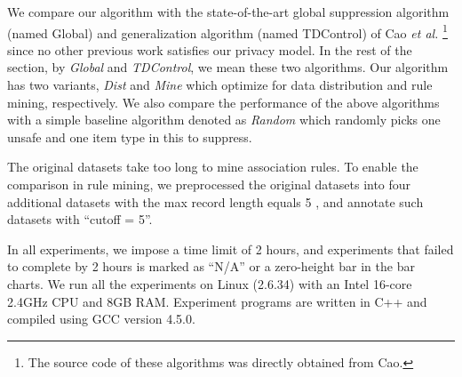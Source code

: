 We compare our algorithm with the state-of-the-art global suppression
algorithm (named Global) and generalization algorithm (named TDControl) of
Cao {\em et al.} \cite{Cao:2010:rho}\footnote{The source code of these
algorithms was directly obtained from Cao.} since no other previous work
satisfies our privacy model. In the rest of the section, by {\em Global}
and {\em TDControl}, we mean these two algorithms.
Our algorithm has two variants, {\em Dist} and {\em Mine} which optimize
for data distribution and rule mining, respectively.
We also compare the performance of the above algorithms with a simple
baseline algorithm denoted as {\em Random} which
randomly picks one unsafe \qid and one item type in this \qid to suppress.

The original datasets take too long to mine association rules.
 To enable the comparison in rule mining, we preprocessed the
original datasets into four additional datasets with the max record length equals 5
, and annotate such datasets with ``cutoff = 5''.



In all experiments, we impose a time limit of
2 hours, and experiments that failed to complete by 2 hours is marked
as ``N/A'' or a zero-height bar in the bar charts.
We run all the experiments on Linux (2.6.34) with an Intel 16-core 2.4GHz CPU
and 8GB RAM. Experiment programs are written in C++ and compiled using GCC
version 4.5.0.


%
%

